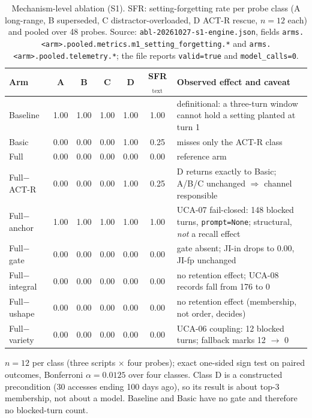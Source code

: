 \begin{table}[t]
\centering\footnotesize\setlength{\tabcolsep}{4pt}
\caption{Mechanism-level ablation (S1). SFR: setting-forgetting rate per probe
class (A long-range, B superseded, C distractor-overloaded, D ACT-R rescue,
$n=12$ each) and pooled over 48 probes. Source:
\texttt{abl-\allowbreak{}20261027-\allowbreak{}s1-\allowbreak{}engine.\allowbreak{}json}, fields
\texttt{arms.\allowbreak{}<arm>.\allowbreak{}pooled.\allowbreak{}metrics.\allowbreak{}m1\_\allowbreak{}setting\_\allowbreak{}forgetting.\allowbreak{}*} and
\texttt{arms.\allowbreak{}<arm>.\allowbreak{}pooled.\allowbreak{}telemetry.\allowbreak{}*}; the file reports \texttt{valid=true} and
\texttt{model\_calls=0}.}\label{tab:mech}
\begin{tabular}{@{}l cccc c p{}@{}}
\toprule
Arm & A & B & C & D & SFR$_{\text{text}}$ & Observed effect and caveat \\
\midrule
Baseline & 1.00 & 1.00 & 1.00 & 1.00 & 1.00 & definitional: a three-turn window cannot hold a setting planted at turn 1 \\
Basic & 0.00 & 0.00 & 0.00 & 1.00 & 0.25 & misses only the ACT-R class \\
Full & 0.00 & 0.00 & 0.00 & 0.00 & 0.00 & reference arm \\
Full$-$ACT-R & 0.00 & 0.00 & 0.00 & 1.00 & 0.25 & D returns exactly to Basic; A/B/C unchanged $\Rightarrow$ channel responsible \\
Full$-$anchor & 1.00 & 1.00 & 1.00 & 1.00 & 1.00 & UCA-07 fail-closed: 148 blocked turns, \texttt{prompt=None}; structural, \emph{not} a recall effect \\
Full$-$gate & 0.00 & 0.00 & 0.00 & 0.00 & 0.00 & gate absent; JI-in drops to 0.00, JI-fp unchanged \\
Full$-$integral & 0.00 & 0.00 & 0.00 & 0.00 & 0.00 & no retention effect; UCA-08 records fall from 176 to 0 \\
Full$-$ushape & 0.00 & 0.00 & 0.00 & 0.00 & 0.00 & no retention effect (membership, not order, decides) \\
Full$-$variety & 0.00 & 0.00 & 0.00 & 0.00 & 0.00 & UCA-06 coupling: 12 blocked turns; fallback marks 12 $\rightarrow$ 0 \\
\bottomrule
\end{tabular}

\vspace{2pt}
\raggedright\scriptsize
$n=12$ per class (three scripts $\times$ four probes); exact one-sided sign test on
paired outcomes, Bonferroni $\alpha=0.0125$ over four classes. Class D is a
constructed precondition (30 accesses ending 100 days ago), so its result is
about top-3 membership, not about a model. Baseline and Basic have no gate and
therefore no blocked-turn count.
\end{table}

